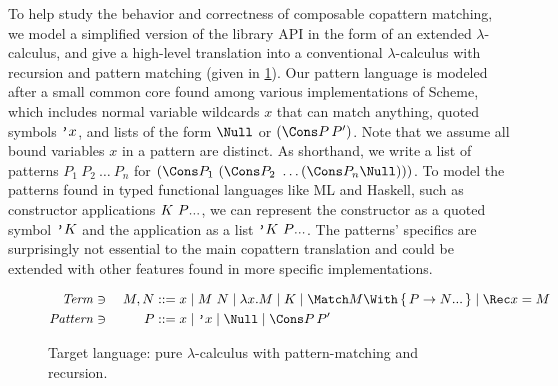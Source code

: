 
To help study the behavior and correctness of composable copattern matching, we model a simplified version of the library API in the form of an extended $\lambda$-calculus, and
give a high-level translation into a conventional $\lambda$-calculus with recursion and pattern matching (given in \cref{fig:target-syntax}).
Our pattern language is modeled after a small common core found among various implementations of Scheme, which includes normal variable wildcards $x$ that can match anything, quoted symbols $\text{\tt'}{x}$, and lists of the form $\Null$ or $(\Cons P \, P')$.
Note that we assume all bound variables $x$ in a pattern are distinct.
As shorthand, we write a list of patterns $P_1 ~ P_2 ~ \dots ~ P_n$ for $(\Cons P_1 ~ (\Cons P_2 ~ \dots (\Cons P_n \Null)))$.
To model the patterns found in typed functional languages like ML and Haskell, such as constructor applications $K ~ P\overset{{}_{}}{...}$, we can represent the constructor as a quoted symbol $\text{\tt'}{K}$ and the application as a list $\text{\tt'}{K} ~ P\overset{{}_{}}{...}$.
The patterns' specifics are surprisingly not essential to the main copattern translation and could be extended with other features found in more specific implementations.  

\begin{figure}[t]
\centering
\begin{alignat*}{2}
  \mathit{Term} &\ni{}& M, N
  &::= x
  \mid M ~ N
  \mid \lambda x. M
  \mid K
  \mid \Match M \With \set{\many{P \to N}}
  \mid \Rec x = M
  \\
  \mathit{Pattern} &\ni{}& P
  &::= x
  \mid \q{x}
  \mid \Null
  \mid \Cons P \, P'
\end{alignat*}

\caption{Target language: pure $\lambda$-calculus with pattern-matching and recursion.}
\label{fig:target-syntax}
\end{figure}

